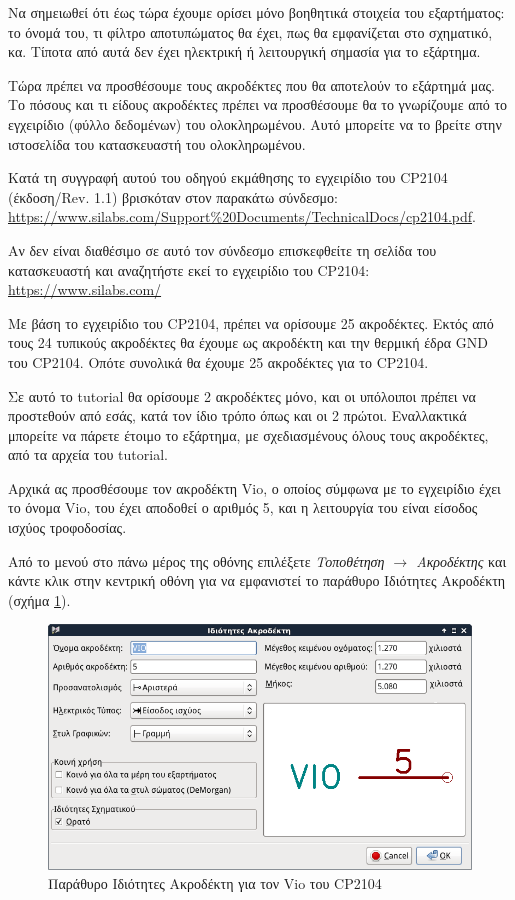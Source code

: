 \documentclass[a4paper]{article}
\begin{document}
Να σημειωθεί ότι έως τώρα έχουμε ορίσει μόνο βοηθητικά στοιχεία του εξαρτήματος: το όνομά του, τι φίλτρο αποτυπώματος θα έχει, πως θα εμφανίζεται στο σχηματικό, κα. Τίποτα από αυτά δεν έχει ηλεκτρική ή λειτουργική σημασία για το εξάρτημα.

Τώρα πρέπει να προσθέσουμε τους ακροδέκτες που θα αποτελούν το εξάρτημά μας. Το πόσους και τι είδους ακροδέκτες πρέπει να προσθέσουμε θα το γνωρίζουμε από το εγχειρίδιο (φύλλο δεδομένων) του ολοκληρωμένου. Αυτό μπορείτε να το βρείτε στην ιστοσελίδα του κατασκευαστή του ολοκληρωμένου. 

Κατά τη συγγραφή αυτού του οδηγού εκμάθησης το εγχειρίδιο του CP2104 (έκδοση/Rev. 1.1) βρισκόταν στον παρακάτω σύνδεσμο:\\
\href{https://www.silabs.com/Support\%20Documents/TechnicalDocs/cp2104.pdf}{https://www.silabs.com/Support\%20Documents/TechnicalDocs/cp2104.pdf}. 

Αν δεν είναι διαθέσιμο σε αυτό τον σύνδεσμο επισκεφθείτε τη σελίδα του κατασκευαστή και αναζητήστε εκεί το εγχειρίδιο του CP2104: \\
\href{https://www.silabs.com/}{https://www.silabs.com/}

Με βάση το εγχειρίδιο του CP2104, πρέπει να ορίσουμε 25 ακροδέκτες. Εκτός από τους 24 τυπικούς ακροδέκτες θα έχουμε ως ακροδέκτη και την θερμική έδρα GND του CP2104. Οπότε συνολικά θα έχουμε 25 ακροδέκτες για το CP2104.

Σε αυτό το tutorial θα ορίσουμε 2 ακροδέκτες μόνο, και οι υπόλοιποι πρέπει να προστεθούν από εσάς, κατά τον ίδιο τρόπο όπως και οι 2 πρώτοι. Εναλλακτικά μπορείτε να πάρετε έτοιμο το εξάρτημα, με σχεδιασμένους όλους τους ακροδέκτες, από τα αρχεία του tutorial.

Αρχικά ας προσθέσουμε τον ακροδέκτη Vio, ο οποίος σύμφωνα με το εγχειρίδιο έχει το όνομα Vio, του έχει αποδοθεί ο αριθμός 5, και η λειτουργία του είναι είσοδος ισχύος τροφοδοσίας.

Από το μενού στο πάνω μέρος της οθόνης επιλέξετε \textit{Τοποθέτηση $\rightarrow$ Ακροδέκτης} και κάντε κλικ στην κεντρική οθόνη για να εμφανιστεί το παράθυρο Ιδιότητες Ακροδέκτη (σχήμα \ref{fig:libed-dial-viocompprop}).

\begin{figure}
  \begin{center}
    \includegraphics[width=.5\textwidth]{img/libed-dial-viocompprop.png}
    \caption{Παράθυρο Ιδιότητες Ακροδέκτη για τον Vio του CP2104}
    \label{fig:libed-dial-viocompprop}
  \end{center}
\end{figure}
\end{document}
